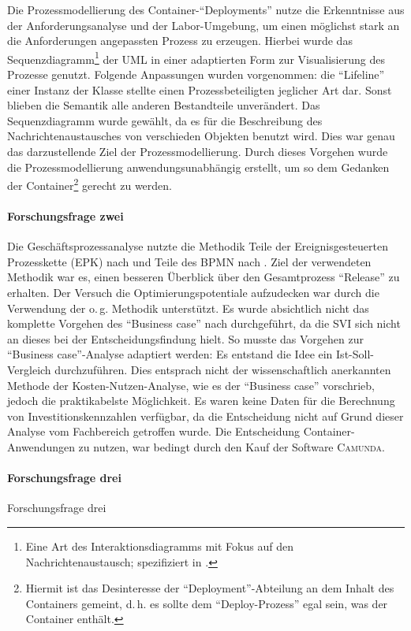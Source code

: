 Die Prozessmodellierung des Container-\enquote{Deployments} nutze die Erkenntnisse aus der Anforderungsanalyse und der Labor-Umgebung, um einen möglichst stark an die Anforderungen angepassten Prozess zu erzeugen. Hierbei wurde das Sequenzdiagramm\footnote{Eine Art des Interaktionsdiagramms mit Fokus auf den Nachrichtenaustausch; spezifiziert in \cite[][S.\,595-599]{object_management_group_omg_unified_2017}.} der \ac{UML} in einer adaptierten Form zur Visualisierung des Prozesse genutzt. Folgende Anpassungen wurden vorgenommen: die \enquote{Lifeline} einer Instanz der Klasse stellte einen Prozessbeteiligten jeglicher Art dar. Sonst blieben die Semantik alle anderen Bestandteile unverändert. Das Sequenzdiagramm wurde gewählt, da es für die Beschreibung des Nachrichtenaustausches von verschieden Objekten benutzt wird. Dies war genau das darzustellende Ziel der Prozessmodellierung. Durch dieses Vorgehen wurde die Prozessmodellierung anwendungsunabhängig erstellt, um so dem Gedanken der Container\footnote{Hiermit ist das Desinteresse der \enquote{Deployment}-Abteilung an dem Inhalt des Containers gemeint, d.\,h. es sollte dem  \enquote{Deploy-Prozess} egal sein, was der Container enthält.} gerecht zu werden. 

\paragraph{Forschungsfrage zwei}
Die Geschäftsprozessanalyse nutzte die Methodik Teile der Ereignisgesteuerten Prozesskette (\acs{EPK}) nach \cite{scheer_objektorientierte_1997} und Teile des \ac{BPMN} nach \cite{object_management_group_omg_business_2011}. Ziel der verwendeten Methodik war es, einen besseren Überblick über den Gesamtprozess \enquote{Release} zu erhalten. Der Versuch die Optimierungspotentiale aufzudecken war durch die Verwendung der o.\,g. Methodik unterstützt. Es wurde absichtlich nicht das komplette Vorgehen des \enquote{Business case} nach \cite{brugger_it_2009} durchgeführt, da die \ac{SVI} sich nicht an dieses bei der Entscheidungsfindung hielt. So musste das Vorgehen zur \enquote{Business case}-Analyse adaptiert werden: Es entstand die Idee ein Ist-Soll-Vergleich durchzuführen. Dies entsprach nicht der wissenschaftlich anerkannten Methode der Kosten-Nutzen-Analyse, wie es der \enquote{Business case} vorschrieb, jedoch die praktikabelste Möglichkeit. Es waren keine Daten für die Berechnung von Investitionskennzahlen verfügbar, da die Entscheidung nicht auf Grund dieser Analyse vom Fachbereich getroffen wurde. Die Entscheidung Container-Anwendungen zu nutzen, war bedingt durch den Kauf der Software \textsc{Camunda}. 

\paragraph{Forschungsfrage drei}
Forschungsfrage drei